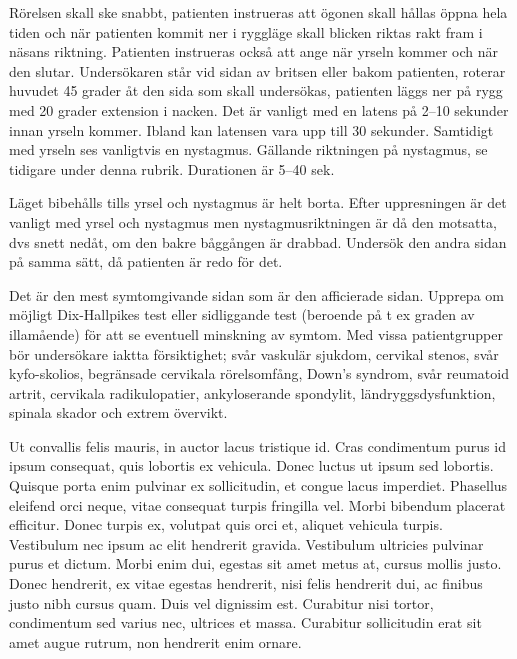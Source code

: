 Rörelsen skall ske snabbt, patienten instrueras att ögonen skall hållas öppna hela tiden och när patienten kommit ner i ryggläge skall blicken riktas rakt fram i näsans riktning. Patienten instrueras också att ange när yrseln kommer och när den slutar. Undersökaren står vid sidan av britsen eller bakom patienten, roterar huvudet 45 grader åt den sida som skall undersökas, patienten läggs ner på rygg med 20 grader extension i nacken. Det är vanligt med en latens på 2–10 sekunder innan yrseln kommer. Ibland kan latensen vara upp till 30 sekunder. 
Samtidigt med yrseln ses vanligtvis en nystagmus. Gällande riktningen på nystagmus, se tidigare under denna rubrik. Durationen är 5–40 sek. 

Läget bibehålls tills yrsel och nystagmus är helt borta. Efter uppresningen är det vanligt med yrsel och nystagmus men nystagmusriktningen är då den motsatta, dvs snett nedåt, om den bakre båggången är drabbad. Undersök den andra sidan på samma sätt, då patienten är redo för det. 

Det är den mest symtomgivande sidan som är den afficierade sidan. Upprepa om möjligt Dix-Hallpikes test eller sidliggande test (beroende på t ex graden av illamående) för att se eventuell minskning av symtom. Med vissa patientgrupper bör undersökare iaktta försiktighet; svår vaskulär sjukdom, cervikal stenos, svår kyfo-skolios, begränsade cervikala rörelsomfång, Down’s syndrom, svår reumatoid artrit, cervikala radikulopatier, ankyloserande spondylit, ländryggsdysfunktion, spinala skador och extrem övervikt.

\newcount\piclines
\newcount\picafterline
{}

Ut convallis felis mauris, in auctor lacus tristique id. Cras condimentum purus id ipsum consequat, quis lobortis ex vehicula. Donec luctus ut ipsum sed lobortis. Quisque porta enim pulvinar ex sollicitudin, et congue lacus imperdiet. Phasellus eleifend orci neque, vitae consequat turpis fringilla vel. Morbi bibendum placerat efficitur. Donec turpis ex, volutpat quis orci et, aliquet vehicula turpis.
Vestibulum nec ipsum ac elit hendrerit gravida. Vestibulum ultricies pulvinar purus et dictum. Morbi enim dui, egestas sit amet metus at, cursus mollis justo. Donec hendrerit, ex vitae egestas hendrerit, nisi felis hendrerit dui, ac finibus justo nibh cursus quam. Duis vel dignissim est. Curabitur nisi tortor, condimentum sed varius nec, ultrices et massa. Curabitur sollicitudin erat sit amet augue rutrum, non hendrerit enim ornare.

